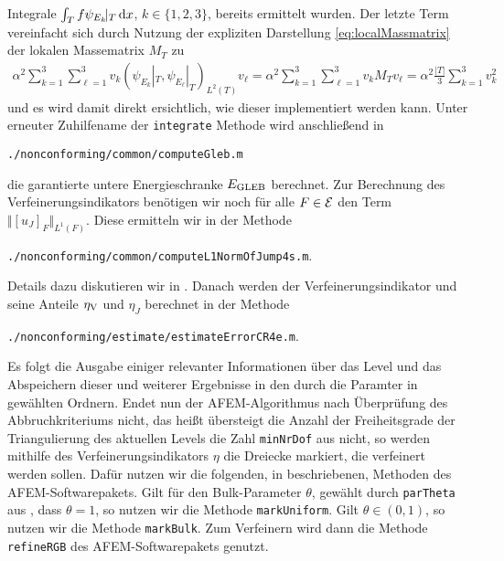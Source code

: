 Integrale $\int_T f\psi_{E_k}\!|_T\,\mathrm{d}x$, $k\in\{1,2,3\}$, bereits ermittelt
wurden.
Der letzte Term vereinfacht sich durch Nutzung der expliziten Darstellung
\eqref{eq:localMassmatrix} der lokalen Massematrix $M_T$ zu
\begin{align*}
  \alpha^2 \sum_{k=1}^3 \sum_{\ell=1}^3 
    v_k \left(\psi_{E_k}\!|_T,\psi_{E_\ell}|_T\right)_{L^2(T)}v_\ell
  =
  \alpha^2 \sum_{k=1}^3 \sum_{\ell=1}^3 
    v_k M_T v_\ell
  =
  \alpha^2\frac{|T|}{3}\sum_{k=1}^3 v_k^2
\end{align*}
und es wird damit direkt ersichtlich, wie dieser implementiert werden kann.
Unter erneuter Zuhilfename der \texttt{integrate} Methode wird anschließend
in
\begin{center}
  \texttt{./nonconforming/common/computeGleb.m}
\end{center}
die garantierte untere Energieschranke $E_\textup{GLEB}$ berechnet. 
Zur Berechnung des Verfeinerungsindikators benötigen wir noch
für alle $F\in\mathcal{E}$ den Term $\Vert[u_J]_F\Vert_{L^1(F)}$. Diese ermitteln wir
in der Methode 
\begin{center}
  \texttt{./nonconforming/common/computeL1NormOfJump4s.m}.
\end{center} 
Details dazu diskutieren wir in .
Danach werden der Verfeinerungsindikator
und seine Anteile $\eta_\textup{V}$ und $\eta_J$ berechnet in der Methode
\begin{center}
  \texttt{./nonconforming/estimate/estimateErrorCR4e.m}.
\end{center}
Es folgt die Ausgabe einiger relevanter Informationen über das Level und das
Abspeichern dieser und weiterer Ergebnisse in den durch die Paramter in
 gewählten Ordnern.
Endet nun der AFEM-Algorithmus nach Überprüfung des Abbruchkriteriums nicht,
das heißt übersteigt die Anzahl der Freiheitsgrade der Triangulierung des
aktuellen Levels die Zahl \texttt{minNrDof} aus  nicht, so
werden mithilfe des Verfeinerungsindikators $\eta$ die Dreiecke markiert, die
verfeinert werden sollen. 
Dafür nutzen wir die folgenden, in \cite[Abschnitt 1.6]{CGKNRR10}
beschriebenen, Methoden des AFEM-Softwarepakets.
Gilt für den Bulk-Parameter $\theta$, gewählt durch \texttt{parTheta} aus
, dass $\theta=1$, so nutzen
wir die Methode \texttt{markUniform}. Gilt $\theta\in(0,1)$, so nutzen wir
die Methode \texttt{markBulk}.
Zum Verfeinern wird dann die Methode \texttt{refineRGB} \cite[1.7.2]{CGKNRR10}
des AFEM-Softwarepakets genutzt.

